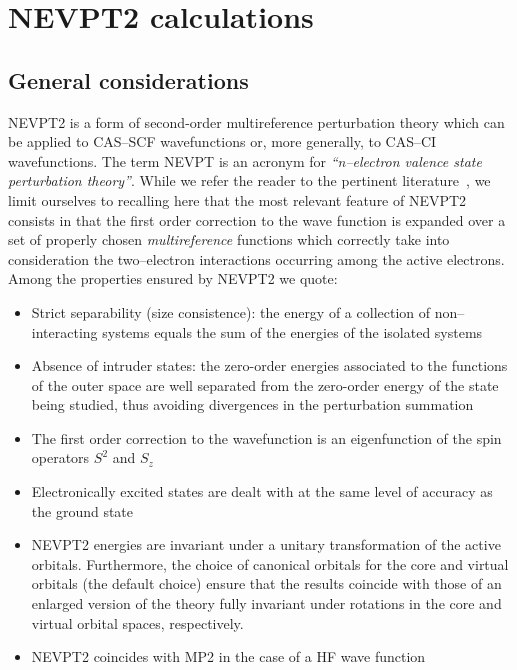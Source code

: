 \chapter{NEVPT2 calculations}\label{ch:nevpt2}

\section{General considerations}\label{sec:nevptgeneral}
NEVPT2  is a form of second-order multireference
perturbation theory 
which can be applied to CAS--SCF wavefunctions or, more generally, to
CAS--CI wavefunctions. The term NEVPT is an acronym for
\textit{``n--electron valence state perturbation theory''}. While we
refer the reader to the pertinent
literature~\cite{nevpt1,nevpt2,nevpt3}, we limit ourselves to
recalling here that the most relevant feature of NEVPT2 consists in
that the first order correction to the wave function is expanded over a
set of properly chosen \emph{multireference} functions which correctly
take into consideration the two--electron interactions occurring among
the active electrons. Among the properties ensured by NEVPT2 we quote:

\begin{itemize}
\item Strict separability (size consistence): the energy of a
  collection of non--interacting systems equals the sum of the
  energies of the isolated systems
\item Absence of intruder states: the zero-order energies associated
  to the functions of the outer space are well separated from the
  zero-order energy of the state being studied, thus avoiding
  divergences in   the perturbation summation
\item The first order correction to the wavefunction is an
  eigenfunction of the spin operators $S^2$ and $S_z$
\item Electronically excited states are dealt with at the same level
  of accuracy as the ground state
\item NEVPT2 energies are invariant under a unitary transformation of
  the active orbitals. Furthermore, the choice of canonical orbitals
  for the core and virtual orbitals (the default choice) ensure that
  the results coincide with those of an enlarged version of the theory
  fully invariant under rotations in the core and virtual orbital
  spaces, respectively.%
\item NEVPT2 coincides with MP2 in the case of a HF wave function
\end{itemize}

